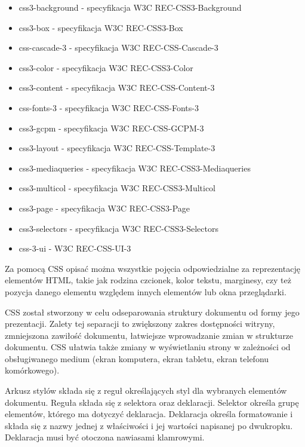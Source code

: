 \documentclass[polish, twoside, 12pt]{mwart}
\begin{document}
\begin{itemize}
  \item css3-background - specyfikacja W3C REC-CSS3-Background \cite{w3c-rec-css3-background}
  \item css3-box - specyfikacja W3C REC-CSS3-Box \cite{w3c-rec-css3-box}
  \item css-cascade-3 - specyfikacja W3C REC-CSS-Cascade-3 \cite{w3c-rec-css3-cascade}
  \item css3-color - specyfikacja W3C REC-CSS3-Color \cite{w3c-rec-css3-color}
  \item css3-content - specyfikacja W3C REC-CSS-Content-3 \cite{w3c-rec-css3-content}
  \item css-fonts-3 - specyfikacja W3C REC-CSS-Fonts-3 \cite{w3c-rec-css3-fonts}
  \item css3-gcpm - specyfikacja W3C REC-CSS-GCPM-3 \cite{w3c-rec-css3-gcpm}
  \item css3-layout - specyfikacja W3C REC-CSS-Template-3 \cite{w3c-rec-css3-template}
  \item css3-mediaqueries - specyfikacja W3C REC-CSS3-Mediaqueries \cite{w3c-rec-css3-mediaqueries}
  \item css3-multicol - specyfikacja W3C REC-CSS3-Multicol \cite{w3c-rec-css3-multicol}
  \item css3-page - specyfikacja W3C REC-CSS3-Page \cite{w3c-rec-css3-page}
  \item css3-selectors - specyfikacja W3C REC-CSS3-Selectors \cite{w3c-rec-css3-selectors}
  \item css-3-ui - W3C REC-CSS-UI-3 \cite{w3c-rec-css3-ui}
\end{itemize}

Za pomocą CSS opisać można wszystkie pojęcia odpowiedzialne za reprezentację elementów HTML, takie jak rodzina czcionek, kolor tekstu, marginesy, czy też pozycja danego elementu względem innych elementów lub okna przeglądarki.

CSS został stworzony w celu odseparowania struktury dokumentu od formy jego prezentacji. Zalety tej separacji to zwiększony zakres dostępności witryny, zmniejszona zawiłość dokumentu, łatwiejsze wprowadzanie zmian w strukturze dokumentu. CSS ułatwia także zmiany w wyświetlaniu strony w zależności od obsługiwanego medium (ekran komputera, ekran tabletu, ekran telefonu komórkowego).

Arkusz stylów składa się z reguł określających styl dla wybranych elementów dokumentu. Reguła składa się z selektora oraz deklaracji. Selektor określa grupę elementów, którego ma dotyczyć deklaracja. Deklaracja określa formatowanie i składa się z nazwy jednej z właściwości i jej wartości napisanej po dwukropku. Deklaracja musi być otoczona nawiasami klamrowymi.
\end{document}
